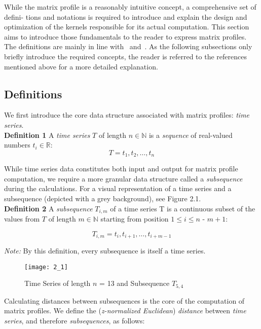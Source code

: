 While the matrix profile is a reasonably intuitive concept, a comprehensive set of defini-
tions and notations is required to introduce and explain the design and optimization of
the kernels responsible for its actual computation. This section aims to introduce those
fundamentals to the reader to express matrix profiles. The definitions are mainly in line
with~\cite{1} and~\cite{2}. As the following subsections only briefly introduce the required
concepts, the reader is referred to the references mentioned above for a more detailed
explanation.

\subsection{Definitions}

We first introduce the core data structure associated with matrix profiles: \textit{time series}.\\

\textbf{Definition 1} A \textit{time series} \(T\) of length \( \textit{n} \in \mathbb{N} \) is a \textit{sequence} of real-valued numbers \( \textit{t}_{i} \in \mathbb{R}\):
\[ T = \textit{t}_{1},\textit{t}_{2},\dots,\textit{t}_{n} \]

While time series data constitutes both input and output for matrix profile computation,
we require a more granular data structure called a \textit{subsequence} during the calculations.
For a visual representation of a time series and a subsequence (depicted with a grey
background), see Figure 2.1.\\

\textbf{Definition 2} A \textit{subsequence} \(T_{i,m}\) of a time series T is a continuous subset of the values from \(T\) of length \( \textit{m} \in \mathbb{N} \) starting from position \( 1 \le \textit{i} \le \textit{n - m} + 1 \):

\[ T_{i,m} = \textit{t}_{i},\textit{t}_{i+1},\dots,\textit{t}_{i + m - 1} \]

\textit{Note:} By this definition, every subsequence is itself a time series.

\begin{figure}[h!]
    \texttt{[image: 2\_1]}
    \centering
    \caption{Time Series of length \( \textit{n} \) = 13 and Subsequence \( T_{5,4} \) }
\end{figure}

Calculating distances between subsequences is the core of the computation of matrix
profiles. We define the (\textit{z-normalized Euclidean}) \textit{distance} between \textit{time series}, and therefore
\textit{subsequences}, as follows:\\

